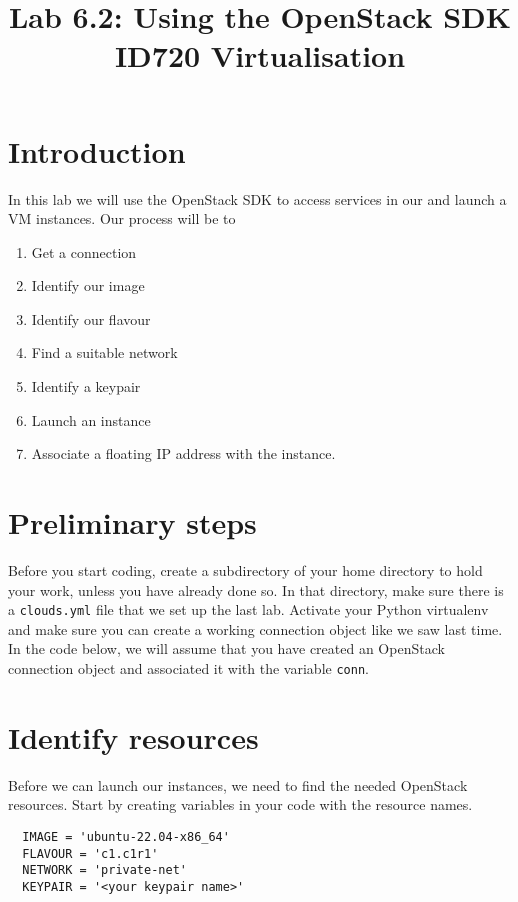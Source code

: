 \documentclass{article}
\begin{document}
\title{Lab 6.2: Using the OpenStack SDK \\ ID720 Virtualisation}
\date{}
\maketitle

\section*{Introduction}
In this lab we will use the OpenStack SDK to access services in our and launch a VM instances. Our process will be to

\begin{enumerate}
  \item Get a connection 
  \item Identify our image
  \item Identify our flavour
  \item Find a suitable network
  \item Identify a keypair
  \item Launch an instance
  \item Associate a floating IP address with the instance.
\end{enumerate}

\section{Preliminary steps}
Before you start coding, create a subdirectory of your home directory to hold your work, unless you have already done so. In that directory, make sure there is a \texttt{clouds.yml} file that we set up the last lab. Activate your Python virtualenv and make sure you can create a working connection object like we saw last time. In the code below, we will assume that you have created an OpenStack connection object and associated it with the variable \texttt{conn}.

\section{Identify resources}
Before we can launch our instances, we need to find the needed OpenStack resources. Start by creating variables in your code with the resource names.

\begin{verbatim}
  IMAGE = 'ubuntu-22.04-x86_64'
  FLAVOUR = 'c1.c1r1'
  NETWORK = 'private-net'
  KEYPAIR = '<your keypair name>'
\end{verbatim}
\end{document}
